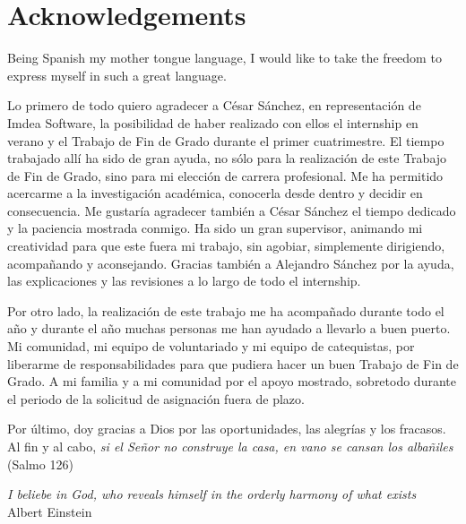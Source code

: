 \chapter*{Acknowledgements}

Being Spanish my mother tongue language, I would like to take the freedom to express myself in such a great language.

Lo primero de todo quiero agradecer a César Sánchez, en representación de Imdea Software, la posibilidad de haber realizado con ellos el internship en verano y el Trabajo de Fin de Grado durante el primer cuatrimestre. 
%
El tiempo trabajado allí ha sido de gran ayuda, no sólo para la realización de este Trabajo de Fin de Grado, sino para mi elección de carrera profesional. 
%
Me ha permitido acercarme a la investigación académica, conocerla desde dentro y decidir en consecuencia.
%
Me gustaría agradecer también a César Sánchez el tiempo dedicado y la paciencia mostrada conmigo. 
%
Ha sido un gran supervisor, animando mi creatividad para que este fuera mi trabajo, sin agobiar, simplemente dirigiendo, acompañando y aconsejando. 
%
Gracias también a Alejandro Sánchez por la ayuda, las explicaciones y las revisiones a lo largo de todo el internship. 


Por otro lado, la realización de este trabajo me ha acompañado durante todo el año y durante el año muchas personas me han ayudado a llevarlo a buen puerto. 
%
Mi comunidad, mi equipo de voluntariado y mi equipo de catequistas, por liberarme de responsabilidades para que pudiera hacer un buen Trabajo de Fin de Grado.
%
A mi familia y a mi comunidad por el apoyo mostrado, sobretodo durante el periodo de la solicitud de asignación fuera de plazo.

Por último, doy gracias a Dios por las oportunidades, las alegrías y los fracasos. Al fin y al cabo, \textit{si el Señor no construye la casa, en vano se cansan los albañiles} (Salmo 126)


\begin{flushright}
\textit{I beliebe in God, who reveals himself in the orderly harmony of what exists}\\
Albert Einstein

\end{flushright}
